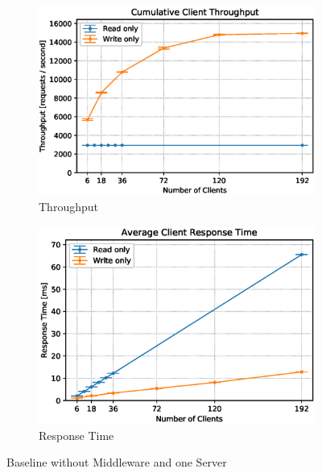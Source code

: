 \documentclass[11pt,a4paper]{article}
\begin{document}
\begin{figure}
    \begin{subfigure}{.5\textwidth}
        \includegraphics[width=1\linewidth]{plots/2_1_throughput.eps}
        \caption{Throughput}
    \end{subfigure}
    \begin{subfigure}{.5\textwidth}
        \includegraphics[width=1\linewidth]{plots/2_1_latency.eps}
        \caption{Response Time}
    \end{subfigure}
    \caption{Baseline without Middleware and one Server}
    \label{fig:2-1}
\end{figure}
\end{document}

